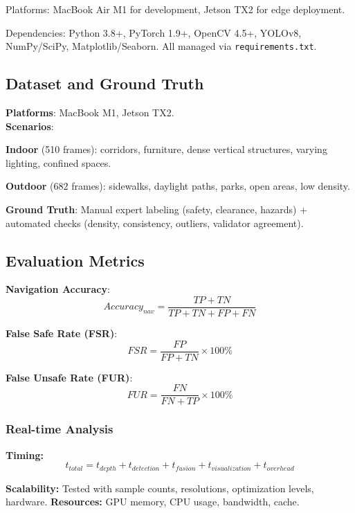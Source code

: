 \documentclass[12pt,oneside]{book}
\begin{document}
Platforms: MacBook Air M1 for development, Jetson TX2 for edge deployment.

Dependencies:
Python 3.8+, PyTorch 1.9+, OpenCV 4.5+, YOLOv8, NumPy/SciPy, Matplotlib/Seaborn.
All managed via \texttt{requirements.txt}.

\subsection{Dataset and Ground Truth}

\textbf{Platforms}: MacBook M1, Jetson TX2.
\textbf{\\Scenarios}:

\textbf{Indoor} (510 frames): corridors, furniture, dense vertical structures, varying lighting, confined spaces.

\textbf{Outdoor} (682 frames): sidewalks, daylight paths, parks, open areas, low density.

\textbf{Ground Truth}:
Manual expert labeling (safety, clearance, hazards) + automated checks (density, consistency, outliers, validator agreement).

\subsection{Evaluation Metrics}

\textbf{Navigation Accuracy}:
\begin{equation}
Accuracy_{nav} = \frac{TP+TN}{TP+TN+FP+FN}
\end{equation}

\textbf{False Safe Rate (FSR)}:
\begin{equation}
FSR = \frac{FP}{FP+TN} \times 100\%
\end{equation}

\textbf{False Unsafe Rate (FUR)}:
\begin{equation}
FUR = \frac{FN}{FN+TP} \times 100\%
\end{equation}

\subsubsection{Real-time Analysis}

\textbf{Timing:}
\begin{equation}
t_{total} = t_{depth}+t_{detection}+t_{fusion}+t_{visualization}+t_{overhead}
\end{equation}

\textbf{Scalability:} Tested with sample counts, resolutions, optimization levels, hardware.
\textbf{Resources:} GPU memory, CPU usage, bandwidth, cache.
\end{document}
